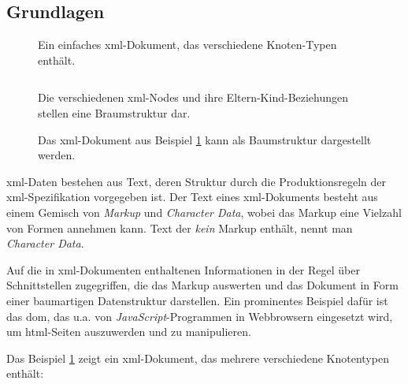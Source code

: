 \subsection{Grundlagen}

\begin{figure}[h!]
    \begin{example} Ein  einfaches \acrshort{xml}-Dokument, das verschiedene Knoten-Typen enthält.

    \label{ex:xmldoc}
    \inputminted{xml}{xmltree.xml}
    \end{example}
\end{figure}

\begin{figure}[h!]
    \begin{example} Die verschiedenen \acrshort{xml}-Nodes und ihre Eltern-Kind-Beziehungen stellen eine Braumstruktur dar.

        \begin{captionbeside}%
            {Das \acrshort{xml}-Dokument aus Beispiel \ref{ex:xmldoc} kann als Baumstruktur dargestellt werden.}
            \label{ex:xmltree}
            
        \end{captionbeside}
    \end{example}
\end{figure}

\acrshort{xml}-Daten bestehen aus Text, deren Struktur durch die Produktionsregeln der \acrshort{xml}-Spezifikation vorgegeben ist. Der Text eines \acrshort{xml}-Dokuments besteht aus einem Gemisch von \emph{Markup} und \emph{Character Data}, wobei das Markup eine Vielzahl von Formen annehmen kann. Text der \emph{kein} Markup enthält, nennt man \emph{Character Data}.

Auf die in \acrshort{xml}-Dokumenten enthaltenen Informationen in der Regel über Schnittstellen zugegriffen, die das Markup auswerten und das Dokument in Form einer baumartigen Datenstruktur darstellen. Ein prominentes Beispiel dafür ist das \acrfull{dom}, das u.a. von \emph{JavaScript}-Programmen in Webbrowsern eingesetzt wird, um  \acrshort{html}-Seiten auszuwerden und zu manipulieren.

Das Beispiel \ref{ex:xmldoc} zeigt ein \acrshort{xml}-Dokument, das mehrere verschiedene Knotentypen enthält:

